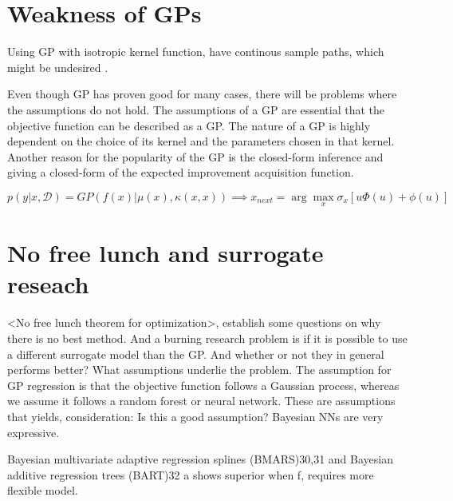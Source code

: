 
\section{Weakness of GPs}
Using GP with isotropic kernel function, have continous sample paths, 
which might be undesired . 


Even though GP has proven good for many cases, there will be problems where the assumptions do not hold. 
The assumptions of a GP are essential that the objective function can be described as a GP.
The nature of a GP is highly dependent on the choice of its kernel and the parameters chosen in that kernel. 
Another reason for the popularity of the GP is the closed-form inference and giving a closed-form of the 
expected improvement acquisition function. 

$$p(y|x, \mathcal{D}) = GP(f(x)|\mu(x), \kappa(x,x)) \implies x_{next} = \arg\max_x \sigma_x [u\Phi(u)+ \phi(u)]$$



\section{No free lunch and surrogate reseach}

<No free lunch theorem for optimization>, establish some questions on why there is no best method.
And a burning research problem is if it is possible to use a different surrogate model than the GP. 
And whether or not they in general performs better? What assumptions underlie the problem. 
The assumption for GP regression is that the objective function follows a Gaussian process, whereas
we assume it follows a random forest or neural network. These are assumptions that yields, consideration:
Is this a good assumption? Bayesian NNs are very expressive. 

Bayesian multivariate adaptive
regression splines (BMARS)30,31 and Bayesian additive regression
trees (BART)32 a
shows superior when f, requires more flexible model. 

